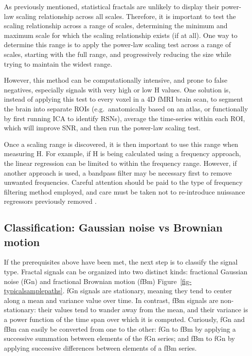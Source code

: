 \documentclass[
  sn-vancouver,
  Numbered,
  referee,
  lineno]{sn-jnl}
\begin{document}
As previously mentioned, statistical fractals are unlikely to display
their power-law scaling relationship across all scales. Therefore, it is
important to test the scaling relationship across a range of scales,
determining the minimum and maximum scale for which the scaling
relationship exists (if at all). One way to determine this range is to
apply the power-law scaling test across a range of scales, starting with
the full range, and progressively reducing the size while trying to
maintain the widest range.

However, this method can be computationally intensive, and prone to
false negatives, especially signals with very high or low H values. One
solution is, instead of applying this test to every voxel in a 4D fMRI
brain scan, to segment the brain into separate ROIs (e.g.~anatomically
based on an atlas, or functionally by first running ICA to identify
RSNs), average the time-series within each ROI, which will improve SNR,
and then run the power-law scaling test.

Once a scaling range is discovered, it is then important to use this
range when measuring H. For example, if H is being calculated using a
frequency approach, the linear regression can be limited to within the
frequency range. However, if another approach is used, a bandpass filter
may be necessary first to remove unwanted frequencies. Careful attention
should be paid to the type of frequency filtering method employed, and
care must be taken not to re-introduce nuissance regressors previously
removed \citep{lindquistModularPreprocessingPipelines2019}.

\subsection{Classification: Gaussian noise vs Brownian
motion}\label{classification-gaussian-noise-vs-brownian-motion}

If the prerequisites above have been met, the next step is to classify
the signal type. Fractal signals can be organized into two distinct
kinds: fractional Gaussian noise (fGn) and fractional Brownian motion
(fBm) Figure~\ref{fig-typicalsamplepaths}. fGn signals are stationary,
meaning they tend to center along a mean and variance value over time.
In contrast, fBm signals are non-stationary: their values tend to wander
away from the mean, and their variance is a power function of the time
span over which it is computed. Curiously, fGn and fBm can easily be
converted from one to the other: fGn to fBm by applying a successive
summation between elements of the fGn series; and fBm to fGn by applying
successive differences between elements of a fBm series.
\end{document}
